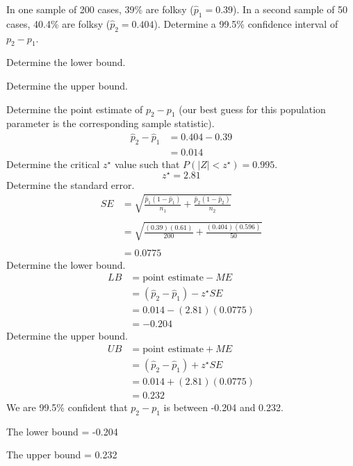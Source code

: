 
\begin{question}
In one sample of 200 cases, 39\% are folksy (\(\hat{p}_1 = 0.39\)). In a
second sample of 50 cases, 40.4\% are folksy (\(\hat{p}_2 = 0.404\)).
Determine a 99.5\% confidence interval of \(p_2 - p_1\).
\begin{answerlist}
  \item Determine the lower bound.
  \item Determine the upper bound.
\end{answerlist}
\end{question}

\begin{solution}
Determine the point estimate of \(p_2-p_1\) (our best guess for this
population parameter is the corresponding sample statistic). \[
\begin{aligned}
\hat{p}_2 - \hat{p}_1 &= 0.404 - 0.39 \\
 &= 0.014
\end{aligned}
\] Determine the critical \(z^\star\) value such that
\(P(|Z|<z^\star) = 0.995\). \[z^\star = 2.81\] Determine the standard
error. \[
\begin{aligned}
SE &= \sqrt{\frac{\hat{p}_1(1-\hat{p}_1)}{n_1}+\frac{\hat{p}_2(1-\hat{p}_2)}{n_2}} \\\\
&= \sqrt{\frac{(0.39)(0.61)}{200}+\frac{(0.404)(0.596)}{50}}\\\\
&= 0.0775
\end{aligned}
\] Determine the lower bound. \[
\begin{aligned}
LB &= \text{point estimate} - ME \\
&= (\hat{p}_2 - \hat{p}_1) - z^\star SE \\
&= 0.014 - (2.81)(0.0775) \\
&= -0.204
\end{aligned}
\] Determine the upper bound. \[
\begin{aligned}
UB &= \text{point estimate} + ME \\
&= (\hat{p}_2 - \hat{p}_1) + z^\star SE \\
&= 0.014 + (2.81)(0.0775) \\
&= 0.232
\end{aligned}
\] We are 99.5\% confident that \(p_2-p_1\) is between -0.204 and 0.232.
\begin{answerlist}
  \item The lower bound = -0.204
  \item The upper bound = 0.232
\end{answerlist}
\end{solution}

